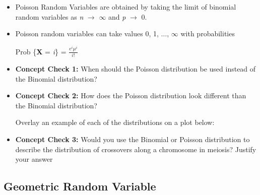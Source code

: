 \documentclass[12pt]{report}
\begin{document}
\begin{itemize}

\item Poisson Random Variables are obtained by taking the limit of binomial random variables as \textit{n} $\rightarrow$ $\infty$ and \textit{p} $\rightarrow$ 0. 

\item Poisson random variables can take values 0, 1, $\ldots$, $\infty$ with probabilities 

Prob \{\textbf{X} = \textit{i}\} = $\frac{e^{i}\mu^{i}}{i!}$

\item \textbf{Concept Check 1:} When should the Poisson distribution be used instead of the Binomial distribution? 

\bigskip

\bigskip

\bigskip
\item \textbf{Concept Check 2:} How does the Poisson distribution look different than the Binomial distribution? 

\bigskip

\bigskip

\bigskip

Overlay an example of each of the distributions on a plot below:

\bigskip

\bigskip

\bigskip

\bigskip

\bigskip

\bigskip

\bigskip

\bigskip

\item \textbf{Concept Check 3:} Would you use the Binomial or Poisson distribution to describe the distribution of crossovers along a chromosome in meiosis? Justify your answer

\end{itemize}

\bigskip

\bigskip

\bigskip

\subsection{Geometric Random Variable}
\end{document}
